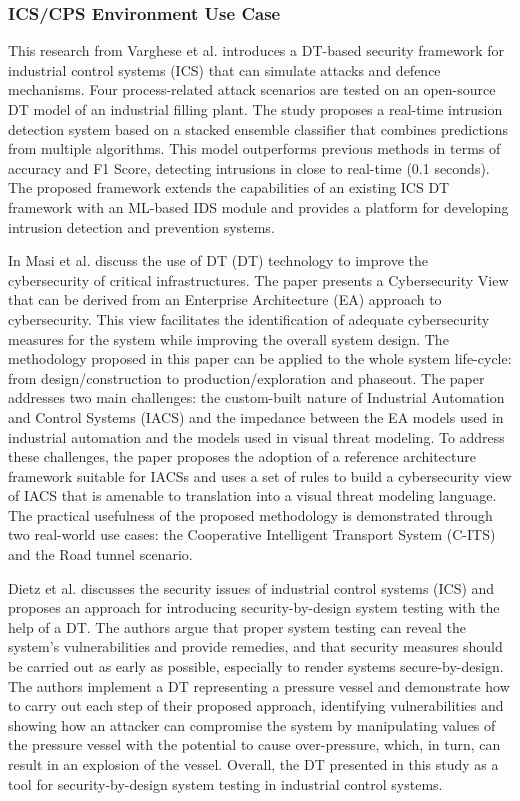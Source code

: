 \subsubsection{ICS/CPS Environment Use Case}

This\cite{vargheseDigitalTwinbasedIntrusion2022} research from Varghese et al. introduces a DT-based security framework for industrial control systems (ICS) that can simulate attacks and defence mechanisms. Four process-related attack scenarios are tested on an open-source DT model of an industrial filling plant. The study proposes a real-time intrusion detection system based on a stacked ensemble classifier that combines predictions from multiple algorithms. This model outperforms previous methods in terms of accuracy and F1 Score, detecting intrusions in close to real-time (0.1 seconds). The proposed framework extends the capabilities of an existing ICS DT framework with an ML-based IDS module and provides a platform for developing intrusion detection and prevention systems.


In\cite{masiSecuringCriticalInfrastructures2023} Masi et al. discuss the  use of DT (DT) technology to improve the cybersecurity of critical infrastructures. The paper presents a Cybersecurity View that can be derived from an Enterprise Architecture (EA) approach to cybersecurity. This view facilitates the identification of adequate cybersecurity measures for the system while improving the overall system design. The methodology proposed in this paper can be applied to the whole system life-cycle: from design/construction to production/exploration and phaseout. The paper addresses two main challenges: the custom-built nature of Industrial Automation and Control Systems (IACS) and the impedance between the EA models used in industrial automation and the models used in visual threat modeling. To address these challenges, the paper proposes the adoption of a reference architecture framework suitable for IACSs and uses a set of rules to build a cybersecurity view of IACS that is amenable to translation into a visual threat modeling language.  The practical usefulness of the proposed methodology is demonstrated through two real-world use cases: the Cooperative Intelligent Transport System (C-ITS) and the Road tunnel scenario. 

Dietz et al.\cite{dietzEmployingDigitalTwins2022} discusses the security issues of industrial control systems (ICS) and proposes an approach for introducing security-by-design system testing with the help of a DT. The authors argue that proper system testing can reveal the system’s vulnerabilities and provide remedies, and that security measures should be carried out as early as possible, especially to render systems secure-by-design. The authors implement a DT representing a pressure vessel and demonstrate how to carry out each step of their proposed approach, identifying vulnerabilities and showing how an attacker can compromise the system by manipulating values of the pressure vessel with the potential to cause over-pressure, which, in turn, can result in an explosion of the vessel. Overall, the DT presented in this study as a tool for security-by-design system testing in industrial control systems.


